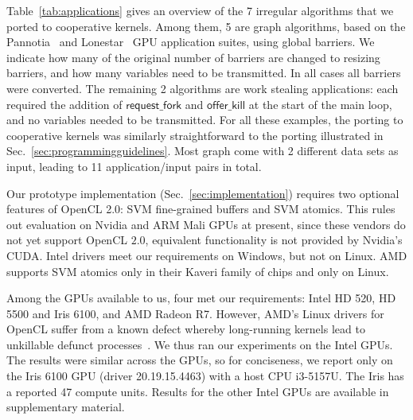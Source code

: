 \documentclass[sigconf]{acmart}
\newcommand{\mytablong}{Table~}
\newcommand{\mysec}{Sec.~}
\newcommand{\nvidia}{Nvidia\xspace}
\newcommand{\offerfork}{\mathsf{request\_fork}}
\newcommand{\offerkill}{\mathsf{offer\_kill}}
\begin{document}
{\mytablong\ref{tab:applications} gives an overview of the 7 irregular
algorithms that we ported to cooperative kernels. Among them, 5 are
graph algorithms, based on the Pannotia~\cite{Pannotia} and
Lonestar~\cite{BNP12} GPU application suites, using global barriers.
We indicate how many of the original number of barriers are changed to
resizing barriers, and how many variables need to be transmitted.  In
all cases all barriers were converted. The remaining 2 algorithms are
work stealing applications: each required the addition of $\offerfork$
and $\offerkill$ at the start of the main loop, and no variables
needed to be transmitted.  For all these examples, the porting to
cooperative kernels was similarly straightforward to the porting
illustrated in \mysec\ref{sec:programmingguidelines}. Most graph come
with 2 different data sets as input, leading to 11 application/input
pairs in total.


Our prototype implementation (\mysec\ref{sec:implementation}) requires
two optional features of OpenCL 2.0: SVM fine-grained buffers and SVM
atomics. This rules out evaluation on \nvidia and ARM Mali GPUs at
present, since these vendors do not yet support OpenCL $2.0$,
equivalent functionality is not provided by \nvidia's CUDA. Intel
drivers meet our requirements on Windows, but not on Linux.
AMD supports SVM atomics only in their Kaveri family of
chips and only on Linux.%

Among the GPUs available to us, four met our requirements: Intel HD
520, HD 5500 and Iris 6100, and AMD Radeon R7.  However, AMD's Linux
drivers for OpenCL suffer from a known defect whereby long-running
kernels lead to unkillable defunct
processes~\cite{amd-defunct-process}.
%
%
We thus ran our experiments on the Intel GPUs. The results
were similar across the GPUs, so for conciseness, we report only on
the Iris 6100 GPU (driver 20.19.15.4463) with a host CPU i3-5157U. The
Iris has a reported 47 compute units. Results for the other Intel GPUs
are available in supplementary material.


}
\end{document}
